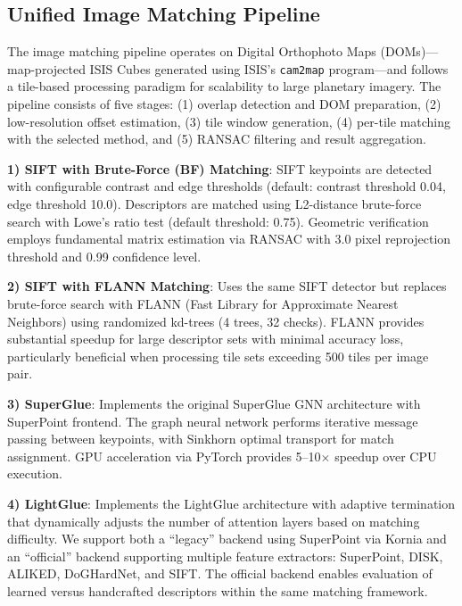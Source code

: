 \documentclass[lettersize,journal]{IEEEtran}
\begin{document}
\subsection{Unified Image Matching Pipeline}

The image matching pipeline operates on Digital Orthophoto Maps (DOMs)—map-projected ISIS Cubes generated using ISIS's \texttt{cam2map} program—and follows a tile-based processing paradigm for scalability to large planetary imagery. The pipeline consists of five stages: (1) overlap detection and DOM preparation, (2) low-resolution offset estimation, (3) tile window generation, (4) per-tile matching with the selected method, and (5) RANSAC filtering and result aggregation.

\textbf{1) SIFT with Brute-Force (BF) Matching}: SIFT keypoints are detected with configurable contrast and edge thresholds (default: contrast threshold 0.04, edge threshold 10.0). Descriptors are matched using L2-distance brute-force search with Lowe's ratio test \cite{lowe1999ratio} (default threshold: 0.75). Geometric verification employs fundamental matrix estimation via RANSAC with 3.0 pixel reprojection threshold and 0.99 confidence level.

\textbf{2) SIFT with FLANN Matching}: Uses the same SIFT detector but replaces brute-force search with FLANN (Fast Library for Approximate Nearest Neighbors) \cite{muja2009flann} using randomized kd-trees (4 trees, 32 checks). FLANN provides substantial speedup for large descriptor sets with minimal accuracy loss, particularly beneficial when processing tile sets exceeding 500 tiles per image pair.

\textbf{3) SuperGlue}: Implements the original SuperGlue GNN architecture \cite{sarlin2020superglue} with SuperPoint \cite{detone2018superpoint} frontend. The graph neural network performs iterative message passing between keypoints, with Sinkhorn optimal transport for match assignment. GPU acceleration via PyTorch provides 5--10$\times$ speedup over CPU execution.

\textbf{4) LightGlue}: Implements the LightGlue architecture \cite{lindenberger2023lightglue} with adaptive termination that dynamically adjusts the number of attention layers based on matching difficulty. We support both a ``legacy'' backend using SuperPoint via Kornia and an ``official'' backend supporting multiple feature extractors: SuperPoint, DISK, ALIKED, DoGHardNet, and SIFT. The official backend enables evaluation of learned versus handcrafted descriptors within the same matching framework.
\end{document}
